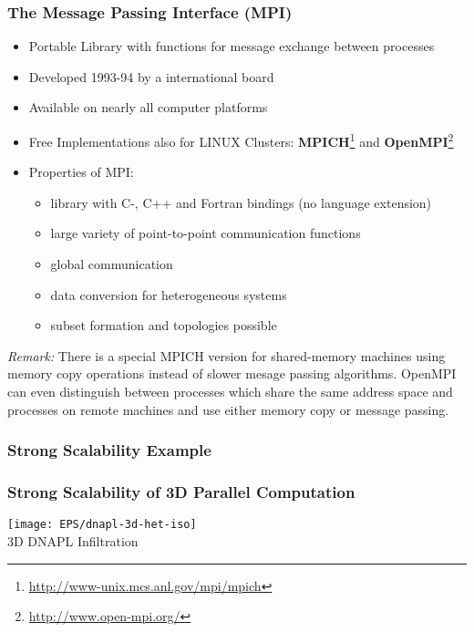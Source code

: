 \begin{frame}
\frametitle{The Message Passing Interface (MPI)}

\begin{itemize}
\item Portable Library with functions for message exchange between processes
\item Developed 1993-94 by a international board
\item Available on nearly all computer platforms
\item Free Implementations also for LINUX Clusters: {\bfseries MPICH}\footnote{\href{http://www-unix.mcs.anl.gov/mpi/mpich}{{\tiny http://www-unix.mcs.anl.gov/mpi/mpich}}}
 and {\bfseries OpenMPI}\footnote{\href{http://www.open-mpi.org/}{{\tiny http://www.open-mpi.org/}}}
\item Properties of MPI:
\begin{itemize}
\item library with C-, C++ and Fortran bindings (no language extension)
\item large variety of point-to-point communication functions
\item global communication
\item data conversion for heterogeneous systems
\item subset formation and topologies possible
\end{itemize}

\end{itemize}

\begin{small}\textit{Remark:} There is a special MPICH version for shared-memory machines using memory copy operations instead of slower mesage passing algorithms.
OpenMPI can even distinguish between processes which share the same address space and
processes on remote machines and use either memory copy or message passing.
\end{small}
\end{frame}

\subsubsection{Strong Scalability Example}
\begin{frame}
\frametitle<presentation>{Strong Scalability of 3D Parallel Computation}
\begin{center}
\texttt{[image: EPS/dnapl-3d-het-iso]}\\
3D DNAPL Infiltration
\end{center}
\end{frame}


